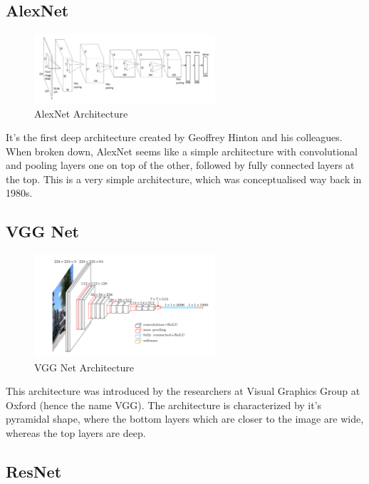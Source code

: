 \subsection[AlexNet]{AlexNet}

\begin{figure}[H]
\centering
\includegraphics[width=0.6\textwidth]{./figures/Alexnet}
\caption{AlexNet Architecture}
\end{figure}

It's the first deep architecture created by Geoffrey Hinton and his colleagues. When broken down, AlexNet seems like a simple architecture with convolutional and pooling layers one on top of the other, followed by fully connected layers at the top. This is a very simple architecture, which was conceptualised way back in 1980s.

\subsection[VGG Net]{VGG Net}

\begin{figure}[H]
\centering
\includegraphics[width=0.6\textwidth]{./figures/VGGNet}
\caption{VGG Net Architecture}
\end{figure}
This architecture was introduced by the researchers at Visual Graphics Group at Oxford (hence the name VGG).
The architecture is characterized by it's pyramidal shape, where the bottom layers which are closer to the image are wide, whereas the top layers are deep.


\subsection[ResNet]{ResNet}

